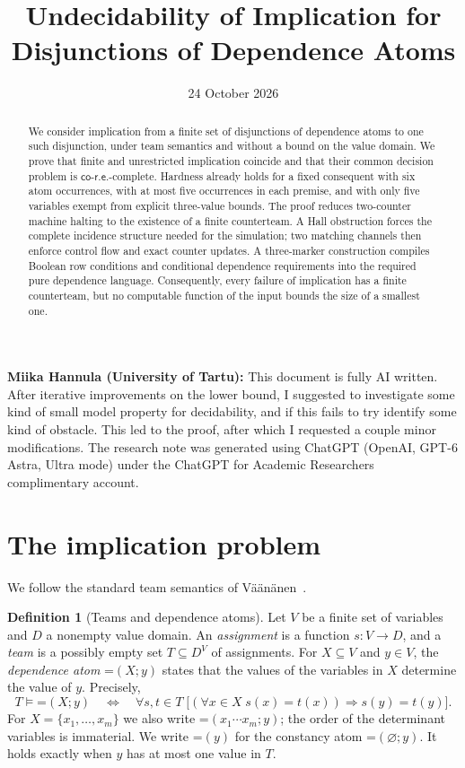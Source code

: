 \documentclass[11pt,a4paper]{article}
\title{Undecidability of Implication for\\Disjunctions of Dependence Atoms}
\author{}
\date{24 October 2026}
\newcommand{\dep}[2]{\mathord{=}(#1;#2)}
\newcommand{\con}[1]{\mathord{=}(#1)}
\newcommand{\coRE}{\mathsf{co\text{-}r.e.}}
\theoremstyle{definition}
\newtheorem{definition}[theorem]{Definition}
\begin{document}
\maketitle
\vspace{-8mm}
\begin{notes}
\textbf{Miika Hannula (University of Tartu):} This document is fully AI written. After iterative improvements on the lower bound, I suggested to investigate some kind of small model property for decidability, and if this fails to try identify some kind of obstacle. This led to the proof, after which I   requested a couple minor modifications.
\tcblower
\small
The research note was generated using ChatGPT (OpenAI, GPT-6 Astra,
Ultra mode) under the ChatGPT for Academic Researchers complimentary account.
\end{notes}

\begin{abstract}
We consider implication from a finite set of disjunctions of dependence
atoms to one such disjunction, under team semantics and
without a bound on the value domain. We prove that finite and unrestricted
implication coincide and that their common decision problem is
$\coRE$-complete. Hardness already holds for a fixed consequent with six
atom occurrences, with at most five occurrences in each premise, and with
only five variables exempt from explicit three-value bounds. The proof
reduces two-counter machine halting to the existence of a finite
counterteam. A Hall obstruction forces the complete incidence structure
needed for the simulation; two matching channels then enforce control
flow and exact counter updates. A three-marker construction compiles
Boolean row conditions and conditional dependence requirements into the required
pure dependence language. Consequently, every failure of implication has
a finite counterteam, but no computable function of the input bounds the
size of a smallest one.
\end{abstract}

\section{The implication problem}
We follow the standard team semantics of
V\"a\"an\"anen~\cite[Chapter~3]{Vaananen07}.

\begin{definition}[Teams and dependence atoms]
\label{def:dependence}
Let $V$ be a finite set of variables and $D$ a nonempty value domain.
An \emph{assignment} is a function $s\colon V\to D$, and a
\emph{team} is a possibly empty set $T\subseteq D^V$ of assignments.
For $X\subseteq V$ and $y\in V$, the \emph{dependence atom}
$\dep Xy$ states that the values of the variables in $X$ determine
the value of $y$. Precisely,
\[
 T\models\dep Xy
 \quad\Longleftrightarrow\quad
 \forall s,t\in T\;
 \bigl[(\forall x\in X\;s(x)=t(x))\Longrightarrow s(y)=t(y)\bigr].
\]
For $X=\{x_1,\ldots,x_m\}$ we also write $\dep{x_1\cdots x_m}{y}$;
the order of the determinant variables is immaterial.
We write $\con y$ for the constancy atom $\dep\varnothing y$.
It holds exactly when $y$ has at most one value in $T$.
\end{definition}
\end{document}

